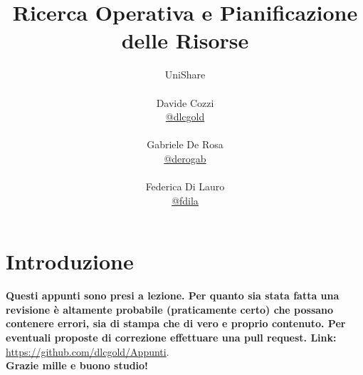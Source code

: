 \documentclass[a4paper,12pt, oneside]{book}
\title{Ricerca Operativa e Pianificazione delle Risorse}
\author{UniShare\\\\Davide Cozzi\\\href{https://t.me/dlcgold}{@dlcgold}\\\\Gabriele De Rosa\\\href{https://t.me/derogab}{@derogab} \\\\Federica Di Lauro\\\href{https://t.me/f_dila}{@f\textunderscore dila}}
\date{}
\begin{document}
\maketitle

\newtheorem{teorema}{Teorema}
\newtheorem{definizione}{Definizione}
\newtheorem{esempio}{Esempio}
\newtheorem{corollario}{Corollario}
\newtheorem{lemma}{Lemma}
\newtheorem{osservazione}{Osservazione}
\newtheorem{nota}{Nota}
\newtheorem{esercizio}{Esercizio}
\tableofcontents
\renewcommand{\chaptermark}[1]{%
  \markboth{\chaptername
    \ \thechapter.\ #1}{}}
\renewcommand{\sectionmark}[1]{\markright{\thesection.\ #1}}
\chapter{Introduzione}
\textbf{Questi appunti sono presi a lezione. Per quanto sia stata
  fatta una revisione è altamente probabile (praticamente certo)
  che possano contenere errori, sia di stampa che di vero e proprio
  contenuto. Per eventuali proposte di correzione effettuare una
  pull request. Link: } \url{https://github.com/dlcgold/Appunti}.\\
\textbf{Grazie mille e buono studio!}
\end{document}
